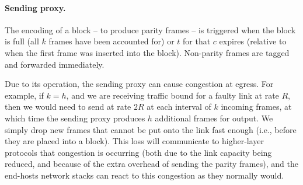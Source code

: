 \paragraph{Sending proxy.}
The encoding of a block -- to produce parity frames -- is
triggered when the block is full (all $k$ frames have been accounted for) or
$t$ for that $c$ expires (relative to when the first frame was inserted into
the block). Non-parity frames are tagged and forwarded immediately.

Due to its operation, the sending proxy can cause congestion at egress.
For example, if $k = h$, and we are receiving traffic bound for
a faulty link at rate $R$, then we would need to send at rate $2R$ at each interval
of $k$ incoming frames, at which time the sending proxy produces $h$ additional
frames for output. We simply drop new frames that cannot be put onto the link
fast enough (i.e., before they are placed into a block).
This loss will communicate to higher-layer protocols that congestion
is occurring (both due to the link capacity being reduced, and
because of the extra overhead of sending the parity frames), and the
end-hosts network stacks can react to this congestion as they
normally would.


